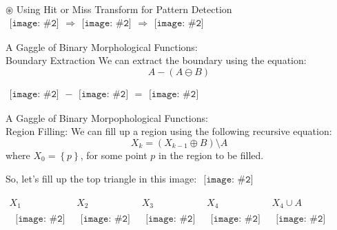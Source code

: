 \documentclass{beamer}
\newcommand{\pic}[2]{
     \begin{array}{l}
      \texttt{[image: \#2]}
      \end{array}
}
\newcommand{\set}[1]{\left\lbrace #1 \right\rbrace}
\newcommand{\union}{\cup}
\newcommand{\dilate}{\oplus}
\newcommand{\erode}{\ominus}
\newcommand{\hitmiss}{\circledast}
\begin{document}
\begin{frame}{$\hitmiss$ Using Hit or Miss Transform for Pattern Detection}
  $\pic{width=75pt}{images/tux_coolhamblenhitmiss.png} 
   \Rightarrow \pic{width=75pt}{images/tux_coolhamblenhitmisstransformed.png}
   \Rightarrow \pic{width=75pt}{images/tux_coolhamblenhitmisstransformeddilate.png}
$


\end{frame}
\begin{frame}{A Gaggle of  Binary Morphological Functions:\\
              Boundary Extraction}
We can extract the boundary using the equation:
$$A - (A \erode B)$$

$\pic{width=75pt}{images/binarycoolhamblen.png}
 -
 \pic{width=75pt}{images/coolhamblen_eroded.png}
 =
 \pic{width=75pt}{images/coolhamblen_boundary.png}$

\end{frame}
\begin{frame}{A Gaggle of Binary Morpophological Functions:\\
              Region Filling:}
  We can fill up a region using the following recursive equation:
  $$X_k=(X_{k-1}\dilate B)\setminus A$$
  where $X_0 = \set{p}$, for some point $p$ in the region to be filled.

  So, let's fill up the top triangle in this image: 
  $\pic{width=20pt}{images/triangles.png}$

$
    \begin{array}{c|c|c|c|c|c}
     X_1 & X_2 & X_3 & X_4 & X_4 \union A\\\
     \pic{width=20pt}{images/triangles1.png}
     &\pic{width=20pt}{images/triangles2.png}
     &\pic{width=20pt}{images/triangles3.png}
     &\pic{width=20pt}{images/triangles4.png}
     &\pic{width=20pt}{images/trianglesfilled.png}
   \end{array}$
 

\end{frame}
\end{document}
